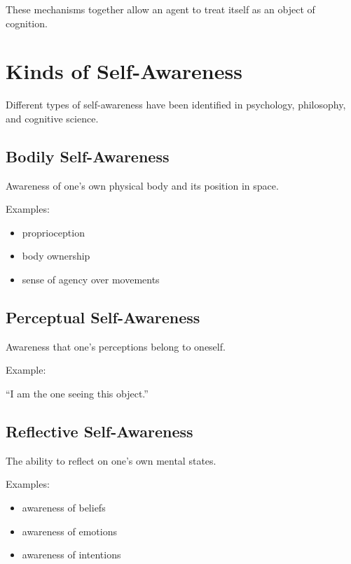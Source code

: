 \documentclass{article}
\begin{document}
        These mechanisms together allow an agent to treat itself as an object of cognition.
    
    
    \section{Kinds of Self-Awareness}
        
        Different types of self-awareness have been identified in psychology, philosophy, and cognitive science.
        
        \subsection{Bodily Self-Awareness}
            
            Awareness of one's own physical body and its position in space.
            
            Examples:
            \begin{itemize}
                \item proprioception
                \item body ownership
                \item sense of agency over movements
            \end{itemize}
        
        \subsection{Perceptual Self-Awareness}
            
            Awareness that one's perceptions belong to oneself.
            
            Example:
            
            ``I am the one seeing this object.''
        
        \subsection{Reflective Self-Awareness}
            
            The ability to reflect on one's own mental states.
            
            Examples:
            
            \begin{itemize}
                \item awareness of beliefs
                \item awareness of emotions
                \item awareness of intentions
            \end{itemize}
        
\end{document}
